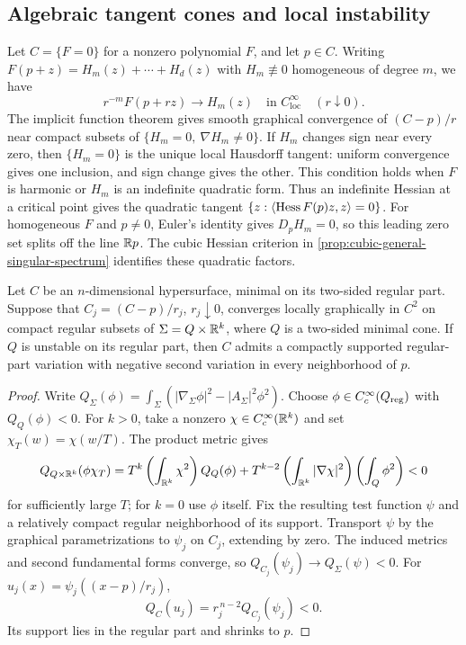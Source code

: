 \subsection{Algebraic tangent cones and local instability}
\label{sec:tangent-instability-transfer}

Let $C=\{F=0\}$ for a nonzero polynomial $F$, and let $p\in C$.
Writing $F(p+z)=H_m(z)+\cdots+H_d(z)$ with $H_m\not\equiv0$
homogeneous of degree $m$, we have
\[
 r^{-m}F(p+rz)\longrightarrow H_m(z)
 \quad\text{in }C^\infty_{\mathrm{loc}}\quad(r\downarrow0).
\]
The implicit function theorem gives smooth graphical convergence of
$(C-p)/r$ near compact subsets of $\{H_m=0,\ \nabla H_m\ne0\}$.
If $H_m$ changes sign near every zero, then $\{H_m=0\}$ is the
unique local Hausdorff tangent: uniform convergence gives one inclusion,
and sign change gives the other. This condition holds when $F$ is harmonic
or $H_m$ is an indefinite quadratic form. Thus an indefinite Hessian at
a critical point gives the quadratic tangent
$\{z:\langle\operatorname{Hess} F(p)z,z\rangle=0\}$.
For homogeneous $F$ and $p\ne0$, Euler's identity gives $D_pH_m=0$,
so this leading zero set splits off the line $\mathbb R p$.
The cubic Hessian criterion in \cref{prop:cubic-general-singular-spectrum}
identifies these quadratic factors.

\begin{lemma}
\label{lem:tangent-instability-transfer}
Let $C$ be an $n$-dimensional hypersurface, minimal on its two-sided
regular part. Suppose that $C_j=(C-p)/r_j$, $r_j\downarrow0$,
converges locally graphically in $C^2$ on compact regular subsets of
$\Sigma=Q\times\mathbb R^k$, where $Q$ is a two-sided minimal cone.
If $Q$ is unstable on its regular part, then $C$ admits a compactly
supported regular-part variation with negative second variation
in every neighborhood of $p$.
\end{lemma}

\begin{proof}
Write $Q_\Sigma(\phi)=\int_\Sigma
(|\nabla_\Sigma\phi|^2-|A_\Sigma|^2\phi^2)$.
Choose $\phi\in C_c^\infty(Q_{\mathrm{reg}})$ with $Q_Q(\phi)<0$.
For $k>0$, take a nonzero $\chi\in C_c^\infty(\mathbb R^k)$ and
set $\chi_T(w)=\chi(w/T)$. The product metric gives
\[
 Q_{Q\times\mathbb R^k}(\phi\chi_T)
 =T^k\left(\int_{\mathbb R^k}\chi^2\right)Q_Q(\phi)
 +T^{k-2}\left(\int_{\mathbb R^k}|\nabla\chi|^2\right)
             \left(\int_Q\phi^2\right)<0
\]
for sufficiently large $T$; for $k=0$ use $\phi$ itself.
Fix the resulting test function $\psi$ and a relatively compact regular
neighborhood of its support. Transport $\psi$ by the graphical
parametrizations to $\psi_j$ on $C_j$, extending by zero.
The induced metrics and second fundamental forms converge, so
$Q_{C_j}(\psi_j)\to Q_\Sigma(\psi)<0$.
For $u_j(x)=\psi_j((x-p)/r_j)$,
\[
 Q_C(u_j)=r_j^{\,n-2}Q_{C_j}(\psi_j)<0.
\]
Its support lies in the regular part and shrinks to $p$.
\end{proof}

